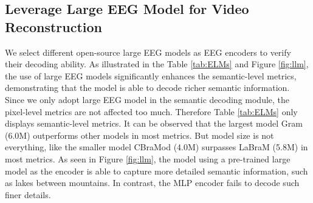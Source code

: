 \documentclass{article}
\begin{document}
\subsection{Leverage Large EEG Model for Video Reconstruction} 
We select different open-source large EEG models as EEG encoders to verify their decoding ability. As illustrated in the Table \ref{tab:ELMs} and Figure \ref{fig:llm}, the use of large EEG models significantly enhances the semantic-level metrics, demonstrating that the model is able to decode richer semantic information.
Since we only adopt large EEG model in the semantic decoding module, the pixel-level metrics are not affected too much. Therefore Table \ref{tab:ELMs} only displays semantic-level metrics.
It can be observed that the largest model Gram (6.0M) outperforms other models in most metrics. But model size is not everything, like the smaller model CBraMod (4.0M) surpasses LaBraM (5.8M) in most metrics.
As seen in Figure \ref{fig:llm}, the model using a pre-trained large model as the encoder is able to capture more detailed semantic information, such as lakes between mountains. In contrast, the MLP encoder fails to decode such finer details.
\end{document}
